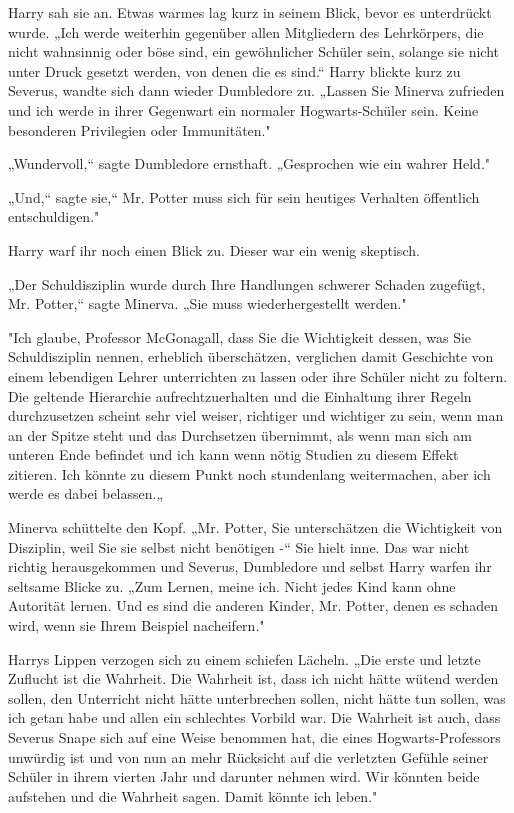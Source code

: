 {Harry sah sie an. Etwas warmes lag kurz in seinem Blick, bevor es unterdrückt wurde. „Ich werde weiterhin gegenüber allen Mitgliedern des Lehrkörpers, die nicht wahnsinnig oder böse sind, ein gewöhnlicher Schüler sein, solange sie nicht unter Druck gesetzt werden, von denen die es sind.“ Harry blickte kurz zu Severus, wandte sich dann wieder Dumbledore zu. „Lassen Sie Minerva zufrieden und ich werde in ihrer Gegenwart ein normaler Hogwarts-Schüler sein. Keine besonderen Privilegien oder Immunitäten."

„Wundervoll,“ sagte Dumbledore ernsthaft. „Gesprochen wie ein wahrer Held."

„Und,“ sagte sie,“ Mr. Potter muss sich für sein heutiges Verhalten öffentlich entschuldigen."

Harry warf ihr noch einen Blick zu. Dieser war ein wenig skeptisch.

„Der Schuldisziplin wurde durch Ihre Handlungen schwerer Schaden zugefügt, Mr. Potter,“ sagte Minerva. „Sie muss wiederhergestellt werden."

"Ich glaube, Professor McGonagall, dass Sie die Wichtigkeit dessen, was Sie Schuldisziplin nennen, erheblich überschätzen, verglichen damit Geschichte von einem lebendigen Lehrer unterrichten zu lassen oder ihre Schüler nicht zu foltern. Die geltende Hierarchie aufrechtzuerhalten und die Einhaltung ihrer Regeln durchzusetzen scheint sehr viel weiser, richtiger und wichtiger zu sein, wenn man an der Spitze steht und das Durchsetzen übernimmt, als wenn man sich am unteren Ende befindet und ich kann wenn nötig Studien zu diesem Effekt zitieren. Ich könnte zu diesem Punkt noch stundenlang weitermachen, aber ich werde es dabei belassen.„

Minerva schüttelte den Kopf. „Mr. Potter, Sie unterschätzen die Wichtigkeit von Disziplin, weil Sie sie selbst nicht benötigen -“ Sie hielt inne. Das war nicht richtig herausgekommen und Severus, Dumbledore und selbst Harry warfen ihr seltsame Blicke zu. „Zum Lernen, meine ich. Nicht jedes Kind kann ohne Autorität lernen. Und es sind die anderen Kinder, Mr. Potter, denen es schaden wird, wenn sie Ihrem Beispiel nacheifern."

Harrys Lippen verzogen sich zu einem schiefen Lächeln. „Die erste und letzte Zuflucht ist die Wahrheit. Die Wahrheit ist, dass ich nicht hätte wütend werden sollen, den Unterricht nicht hätte unterbrechen sollen, nicht hätte tun sollen, was ich getan habe und allen ein schlechtes Vorbild war. Die Wahrheit ist auch, dass Severus Snape sich auf eine Weise benommen hat, die eines Hogwarts-Professors unwürdig ist und von nun an mehr Rücksicht auf die verletzten Gefühle seiner Schüler in ihrem vierten Jahr und darunter nehmen wird. Wir könnten beide aufstehen und die Wahrheit sagen. Damit könnte ich leben."

}
